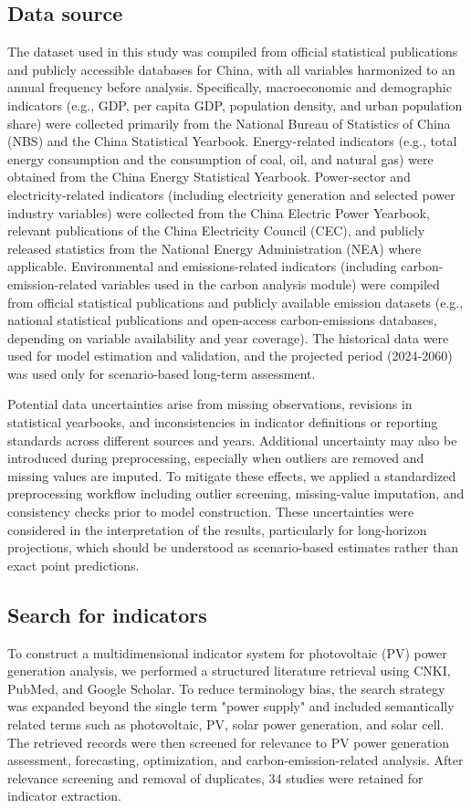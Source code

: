 \documentclass{article}
\begin{document}
	\subsection{Data source}
	The dataset used in this study was compiled from official statistical publications and publicly accessible databases for China, with all variables harmonized to an annual frequency before analysis. Specifically, macroeconomic and demographic indicators (e.g., GDP, per capita GDP, population density, and urban population share) were collected primarily from the National Bureau of Statistics of China (NBS) and the China Statistical Yearbook. Energy-related indicators (e.g., total energy consumption and the consumption of coal, oil, and natural gas) were obtained from the China Energy Statistical Yearbook. Power-sector and electricity-related indicators (including electricity generation and selected power industry variables) were collected from the China Electric Power Yearbook, relevant publications of the China Electricity Council (CEC), and publicly released statistics from the National Energy Administration (NEA) where applicable. Environmental and emissions-related indicators (including carbon-emission-related variables used in the carbon analysis module) were compiled from official statistical publications and publicly available emission datasets (e.g., national statistical publications and open-access carbon-emissions databases, depending on variable availability and year coverage). The historical data were used for model estimation and validation, and the projected period (2024-2060) was used only for scenario-based long-term assessment.
	
	Potential data uncertainties arise from missing observations, revisions in statistical yearbooks, and inconsistencies in indicator definitions or reporting standards across different sources and years. Additional uncertainty may also be introduced during preprocessing, especially when outliers are removed and missing values are imputed. To mitigate these effects, we applied a standardized preprocessing workflow including outlier screening, missing-value imputation, and consistency checks prior to model construction. These uncertainties were considered in the interpretation of the results, particularly for long-horizon projections, which should be understood as scenario-based estimates rather than exact point predictions.
	
	\subsection{Search for indicators}
	To construct a multidimensional indicator system for photovoltaic (PV) power generation analysis, we performed a structured literature retrieval using CNKI, PubMed, and Google Scholar. To reduce terminology bias, the search strategy was expanded beyond the single term "power supply" and included semantically related terms such as photovoltaic, PV, solar power generation, and solar cell. The retrieved records were then screened for relevance to PV power generation assessment, forecasting, optimization, and carbon-emission-related analysis. After relevance screening and removal of duplicates, 34 studies were retained for indicator extraction.
	
\end{document}
